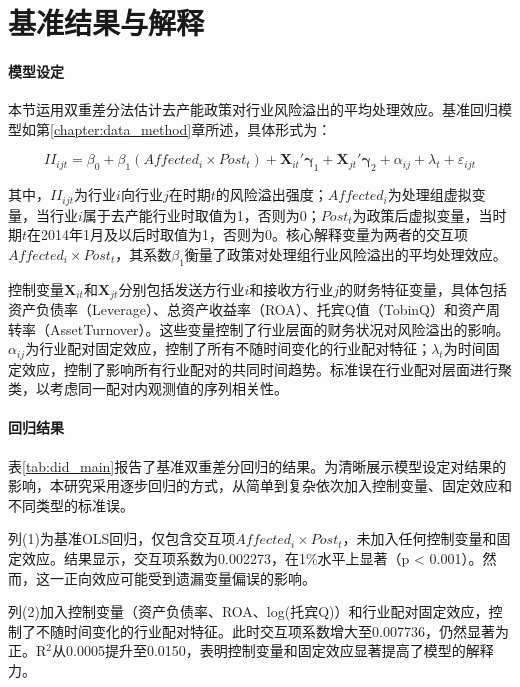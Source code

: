 \section{基准结果与解释}
\label{sec:baseline_did}

\paragraph{模型设定}

本节运用双重差分法估计去产能政策对行业风险溢出的平均处理效应。基准回归模型如第\ref{chapter:data_method}章所述，具体形式为：

\begin{equation}
\label{eq:did_baseline}
II_{ijt} = \beta_0 + \beta_1 (Affected_i \times Post_t) + \bm{X}_{it}'\bm{\gamma}_1 + \bm{X}_{jt}'\bm{\gamma}_2 + \alpha_{ij} + \lambda_t + \varepsilon_{ijt}
\end{equation}

其中，$II_{ijt}$为行业$i$向行业$j$在时期$t$的风险溢出强度；$Affected_i$为处理组虚拟变量，当行业$i$属于去产能行业时取值为1，否则为0；$Post_t$为政策后虚拟变量，当时期$t$在2014年1月及以后时取值为1，否则为0。核心解释变量为两者的交互项$Affected_i \times Post_t$，其系数$\beta_1$衡量了政策对处理组行业风险溢出的平均处理效应。

控制变量$\bm{X}_{it}$和$\bm{X}_{jt}$分别包括发送方行业$i$和接收方行业$j$的财务特征变量，具体包括资产负债率（Leverage）、总资产收益率（ROA）、托宾Q值（TobinQ）和资产周转率（AssetTurnover）。这些变量控制了行业层面的财务状况对风险溢出的影响。$\alpha_{ij}$为行业配对固定效应，控制了所有不随时间变化的行业配对特征；$\lambda_t$为时间固定效应，控制了影响所有行业配对的共同时间趋势。标准误在行业配对层面进行聚类，以考虑同一配对内观测值的序列相关性\citep{bertrand2004much}。

\paragraph{回归结果}

表\ref{tab:did_main}报告了基准双重差分回归的结果。为清晰展示模型设定对结果的影响，本研究采用逐步回归的方式，从简单到复杂依次加入控制变量、固定效应和不同类型的标准误。

列(1)为基准OLS回归，仅包含交互项$Affected_i \times Post_t$，未加入任何控制变量和固定效应。结果显示，交互项系数为0.002273，在1\%水平上显著（p < 0.001）。然而，这一正向效应可能受到遗漏变量偏误的影响。

列(2)加入控制变量（资产负债率、ROA、log(托宾Q)）和行业配对固定效应，控制了不随时间变化的行业配对特征。此时交互项系数增大至0.007736，仍然显著为正。R$^2$从0.0005提升至0.0150，表明控制变量和固定效应显著提高了模型的解释力。

